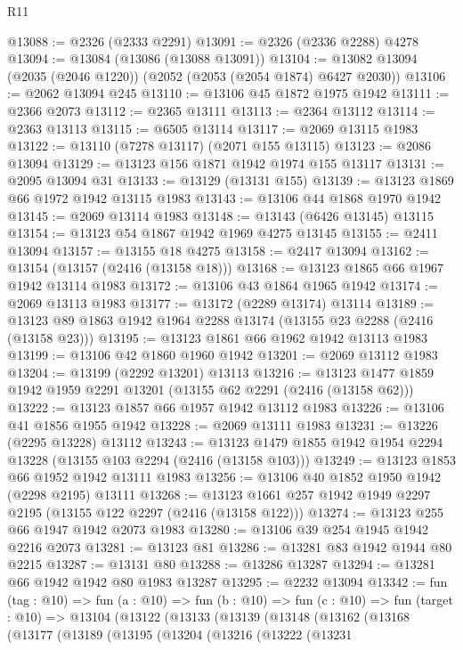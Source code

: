 \begin{lexlean}{R11}
\begin{coremodule}
@13088 := @2326 (@2333 @2291)
@13091 := @2326 (@2336 @2288) @4278
@13094 := @13084 (@13086 (@13088 @13091))
@13104 := @13082 @13094 (@2035 (@2046 @1220)) (@2052 (@2053 (@2054 @1874) @6427 @2030))
@13106 := @2062 @13094 @245
@13110 := @13106 @45 @1872 @1975 @1942
@13111 := @2366 @2073
@13112 := @2365 @13111
@13113 := @2364 @13112
@13114 := @2363 @13113
@13115 := @6505 @13114
@13117 := @2069 @13115 @1983
@13122 := @13110 (@7278 @13117) (@2071 @155 @13115)
@13123 := @2086 @13094
@13129 := @13123 @156 @1871 @1942 @1974 @155 @13117
@13131 := @2095 @13094 @31
@13133 := @13129 (@13131 @155)
@13139 := @13123 @1869 @66 @1972 @1942 @13115 @1983
@13143 := @13106 @44 @1868 @1970 @1942
@13145 := @2069 @13114 @1983
@13148 := @13143 (@6426 @13145) @13115
@13154 := @13123 @54 @1867 @1942 @1969 @4275 @13145
@13155 := @2411 @13094
@13157 := @13155 @18 @4275
@13158 := @2417 @13094
@13162 := @13154 (@13157 (@2416 (@13158 @18)))
@13168 := @13123 @1865 @66 @1967 @1942 @13114 @1983
@13172 := @13106 @43 @1864 @1965 @1942
@13174 := @2069 @13113 @1983
@13177 := @13172 (@2289 @13174) @13114
@13189 := @13123 @89 @1863 @1942 @1964 @2288 @13174 (@13155 @23 @2288 (@2416 (@13158 @23)))
@13195 := @13123 @1861 @66 @1962 @1942 @13113 @1983
@13199 := @13106 @42 @1860 @1960 @1942
@13201 := @2069 @13112 @1983
@13204 := @13199 (@2292 @13201) @13113
@13216 := @13123 @1477 @1859 @1942 @1959 @2291 @13201 (@13155 @62 @2291 (@2416 (@13158 @62)))
@13222 := @13123 @1857 @66 @1957 @1942 @13112 @1983
@13226 := @13106 @41 @1856 @1955 @1942
@13228 := @2069 @13111 @1983
@13231 := @13226 (@2295 @13228) @13112
@13243 := @13123 @1479 @1855 @1942 @1954 @2294 @13228 (@13155 @103 @2294 (@2416 (@13158 @103)))
@13249 := @13123 @1853 @66 @1952 @1942 @13111 @1983
@13256 := @13106 @40 @1852 @1950 @1942 (@2298 @2195) @13111
@13268 := @13123 @1661 @257 @1942 @1949 @2297 @2195 (@13155 @122 @2297 (@2416 (@13158 @122)))
@13274 := @13123 @255 @66 @1947 @1942 @2073 @1983
@13280 := @13106 @39 @254 @1945 @1942 @2216 @2073
@13281 := @13123 @81
@13286 := @13281 @83 @1942 @1944 @80 @2215
@13287 := @13131 @80
@13288 := @13286 @13287
@13294 := @13281 @66 @1942 @1942 @80 @1983 @13287
@13295 := @2232 @13094
@13342 := fun (tag : @10) =>
  fun (a : @10) =>
  fun (b : @10) =>
  fun (c : @10) =>
  fun (target : @10) =>
  @13104
    (@13122
      (@13133
        (@13139
          (@13148
            (@13162
              (@13168
                (@13177
                  (@13189
                    (@13195
                      (@13204
                        (@13216
                          (@13222
                            (@13231

\end{coremodule}
\end{lexlean}

